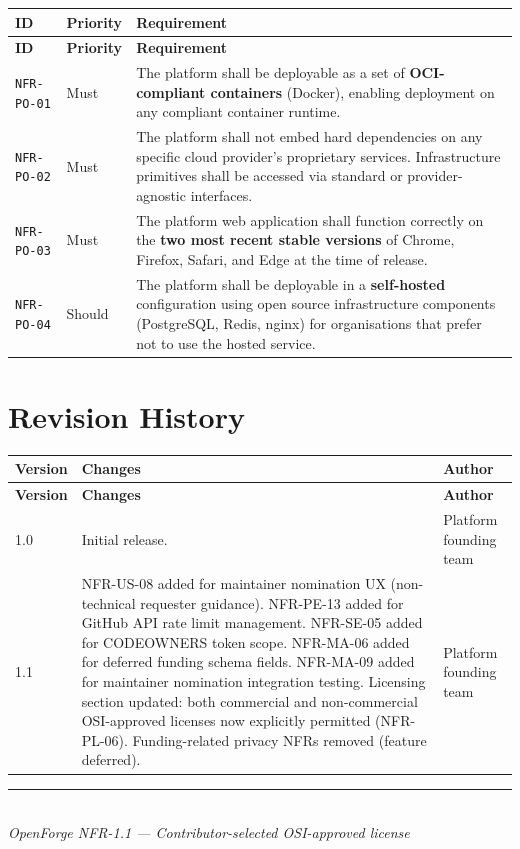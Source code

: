 \documentclass[12pt,a4paper]{article}
\begin{document}
\begin{longtable}{L{2.2cm} L{1.8cm} L{9.3cm}}
  \color{white}\bfseries ID & \color{white}\bfseries Priority & \color{white}\bfseries Requirement \\
  \endfirsthead
  \color{white}\bfseries ID & \color{white}\bfseries Priority & \color{white}\bfseries Requirement \\
  \endhead\hline
  \texttt{NFR-PO-01} & Must   & The platform shall be deployable as a set of \textbf{OCI-compliant containers} (Docker), enabling deployment on any compliant container runtime. \\
  \texttt{NFR-PO-02} & Must   & The platform shall not embed hard dependencies on any specific cloud provider's proprietary services. Infrastructure primitives shall be accessed via standard or provider-agnostic interfaces. \\
  \texttt{NFR-PO-03} & Must   & The platform web application shall function correctly on the \textbf{two most recent stable versions} of Chrome, Firefox, Safari, and Edge at the time of release. \\
  \texttt{NFR-PO-04} & Should & The platform shall be deployable in a \textbf{self-hosted} configuration using open source infrastructure components (PostgreSQL, Redis, nginx) for organisations that prefer not to use the hosted service. \\
  \hline
\end{longtable}

\section*{Revision History}

\begin{longtable}{L{1.5cm} L{8.5cm} L{3.3cm}}
  \color{white}\bfseries Version & \color{white}\bfseries Changes & \color{white}\bfseries Author \\
  \endfirsthead
  \color{white}\bfseries Version & \color{white}\bfseries Changes & \color{white}\bfseries Author \\
  \endhead{} & Initial release. & Platform founding team \\
  1.1 & NFR-US-08 added for maintainer nomination UX (non-technical requester guidance). NFR-PE-13 added for GitHub API rate limit management. NFR-SE-05 added for CODEOWNERS token scope. NFR-MA-06 added for deferred funding schema fields. NFR-MA-09 added for maintainer nomination integration testing. Licensing section updated: both commercial and non-commercial OSI-approved licenses now explicitly permitted (NFR-PL-06). Funding-related privacy NFRs removed (feature deferred). & Platform founding team \\
  \hline
\end{longtable}

\vfill
\begin{center}
\color{ofrule}\rule{0.5\textwidth}{0.4pt}\\[0.5em]
{\small\color{ofgray}\itshape OpenForge NFR-1.1 --- Contributor-selected OSI-approved license}
\end{center}
\end{document}

